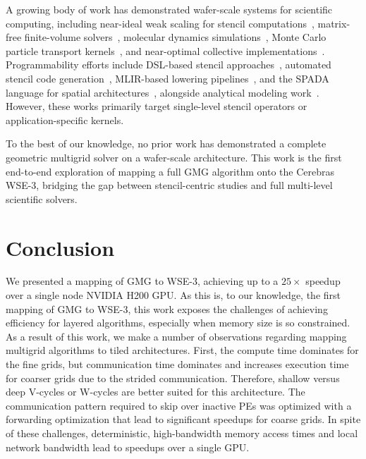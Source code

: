 \documentclass[conference]{IEEEtran}
\begin{document}
    A growing body of work has demonstrated wafer-scale systems for scientific computing, including near-ideal weak scaling for stencil computations~\cite{scalable_25pt_stencil,Rocki,mathias,Sai,sai2}, matrix-free finite-volume solvers~\cite{sai_fv_arxiv,Ltaief}, molecular dynamics simulations~\cite{perez_md_sc24,perez-journal}, Monte Carlo particle transport kernels~\cite{Tramm24,Yoshii26}, and near-optimal collective implementations~\cite{luczynski_reduce}. Programmability efforts include DSL-based stencil approaches~\cite{brown}, automated stencil code generation~\cite{sai_codegen_sc24}, MLIR-based lowering pipelines~\cite{stawinoga_mlir_stencils_wse}, and the SPADA language for spatial architectures~\cite{spada}, alongside analytical modeling work~\cite{gianinazzi_spatialcomputer,gianinazzi2025energy,baumann2024low,luczynski_reduce}. However, these works primarily target single-level stencil operators or application-specific kernels.
    
    To the best of our knowledge, no prior work has demonstrated a complete geometric multigrid solver on a wafer-scale architecture. This work is the first end-to-end exploration of mapping a full GMG algorithm onto the Cerebras WSE-3, bridging the gap between stencil-centric studies and full multi-level scientific solvers.

    \section{Conclusion}
        We presented a mapping of GMG to WSE-3, achieving up to a \(25\times\) speedup over a single node NVIDIA H200 GPU.  As this is, to our knowledge, the first mapping of GMG to WSE-3, this work exposes the challenges of achieving efficiency for layered algorithms, especially when memory size is so constrained. As a result of this work, we make a number of observations regarding mapping multigrid algorithms to tiled architectures.  First, the compute time dominates for the fine grids, but communication time dominates and increases execution time for coarser grids due to the strided communication.  Therefore, shallow versus deep V-cycles or W-cycles are better suited for this architecture. The communication pattern required to skip over inactive PEs was optimized with a forwarding optimization that lead to significant speedups for coarse grids.
        In spite of these challenges, deterministic, high-bandwidth memory access times and local network bandwidth lead to speedups over a single GPU.
\end{document}

